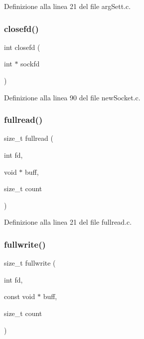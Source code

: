 Definizione alla linea 21 del file arg\+Sett.\+c.

\mbox{\label{a00050_a687133bcb442e7bb71461db9ae2c4202}} 
\subsubsection{\texorpdfstring{closefd()}{closefd()}}
{\footnotesize\ttfamily int closefd (\begin{DoxyParamCaption}\item[{int $\ast$}]{sockfd }\end{DoxyParamCaption})}



Definizione alla linea 90 del file new\+Socket.\+c.

\mbox{\label{a00050_aa6e2320d0a4267b15084f5eed8187380}} 
\subsubsection{\texorpdfstring{fullread()}{fullread()}}
{\footnotesize\ttfamily size\+\_\+t fullread (\begin{DoxyParamCaption}\item[{int}]{fd,  }\item[{void $\ast$}]{buff,  }\item[{size\+\_\+t}]{count }\end{DoxyParamCaption})}



Definizione alla linea 21 del file fullread.\+c.

\mbox{\label{a00050_a07a5975e70c72acac6fb5c1a8a6ce6d4}} 
\subsubsection{\texorpdfstring{fullwrite()}{fullwrite()}}
{\footnotesize\ttfamily size\+\_\+t fullwrite (\begin{DoxyParamCaption}\item[{int}]{fd,  }\item[{const void $\ast$}]{buff,  }\item[{size\+\_\+t}]{count }\end{DoxyParamCaption})}



